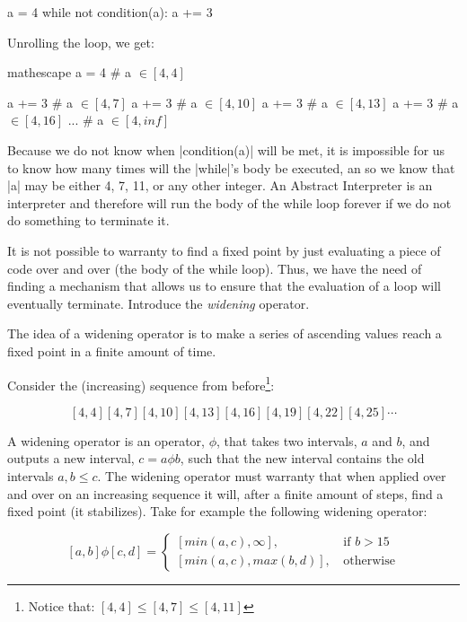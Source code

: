 \begin{pythoncode}
a = 4
while not condition(a):
  a += 3
\end{pythoncode}

Unrolling the loop, we get:

\begin{pythoncode*}{mathescape}
a = 4     # a $\in [4,4]$

  a += 3  # a $\in [4,7]$
  a += 3  # a $\in [4,10]$
  a += 3  # a $\in [4,13]$
  a += 3  # a $\in [4,16]$
  ...
  # a $\in [4, inf]$
\end{pythoncode*}

Because we do not know when \pycode|condition(a)| will be met, it is
impossible for us to know how many times will the \pycode|while|'s body
be executed, an so we know that \pycode|a| may be either 4, 7, 11, or
any other integer. An Abstract Interpreter is an interpreter and
therefore will run the body of the while loop forever if we do not do
something to terminate it.

It is not possible to warranty to find a fixed point by just evaluating a piece of code
over and over (the body of the while loop). Thus, we have the need of finding a mechanism
that allows us to ensure that the evaluation of a loop will eventually terminate. Introduce
the \emph{widening} operator.

The idea of a widening operator is to make a series of ascending values
reach a fixed point in a finite amount of time.

Consider the (increasing) sequence from before\footnote{Notice that: \([4,4] \le [4,7] \le [4,11]\)}:

\[[4,4] [4,7] [4,10] [4,13] [4,16] [4,19] [4,22] [4,25] \cdots\]

A widening operator is an operator, \(\phi\), that takes two intervals, \(a\) and \(b\),
and outputs a new interval, \(c = a \phi b\), such that the new interval contains the old
intervals \(a, b \le c\). The widening operator must warranty that when applied over and
over on an increasing sequence it will, after a finite amount of steps, find a fixed point
(it stabilizes). Take for example the following widening operator:

\[[a, b] \phi [c, d] =
     \begin{cases}
       [min(a,c), \infty]\text{, } & \text{if } b > 15 \\
       [min(a,c), max(b,d)]\text{, } & \text{otherwise}
     \end{cases}\]

